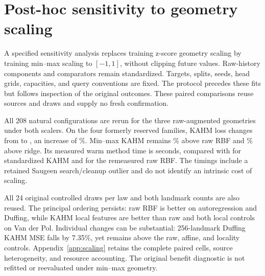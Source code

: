 \section{Post-hoc sensitivity to geometry scaling}\label{sec:scaling}
A specified sensitivity analysis replaces training z-score geometry
scaling by training min--max scaling to $[-1,1]$, without clipping
future values. Raw-history components and comparators remain
standardized. Targets, splits, seeds, head grids, capacities, and query
conventions are fixed. The protocol precedes these fits but follows
inspection of the original outcomes. These paired comparisons reuse
sources and draws and supply no fresh confirmation.

All 208 natural configurations are rerun for the three raw-augmented
geometries under both scalers. On the four formerly reserved families,
KAHM loss changes from \ScalingNaturalKahmStandardLoss{} to
\ScalingNaturalKahmMinmaxLoss{}, an increase of
\ScalingNaturalKahmChangePercent\%. Min--max KAHM remains
\ScalingNaturalKahmVsRawPercent\% above raw RBF and
\ScalingNaturalKahmVsRidgePercent\% above ridge. Its measured warm
method time is \ScalingNaturalKahmMinmaxTime{} seconds, compared with
\ScalingNaturalKahmStandardTime{} for standardized KAHM and
\ScalingNaturalRawTime{} for the remeasured raw RBF. The timings include
a retained Saugeen search/cleanup outlier and do not identify an intrinsic
cost of scaling.

All 24 original controlled draws per law and both landmark counts are
also reused. The principal ordering persists: raw RBF is better on
autoregression and Duffing, while KAHM local features are better than
raw and both local controls on Van der Pol. Individual changes can be
substantial: 256-landmark Duffing KAHM MSE falls by 7.35\%, yet remains
above the raw, affine, and locality controls. Appendix~\ref{app:scaling}
retains the complete paired cells, source heterogeneity, and resource
accounting. The original benefit diagnostic is not refitted or reevaluated
under min--max geometry.
